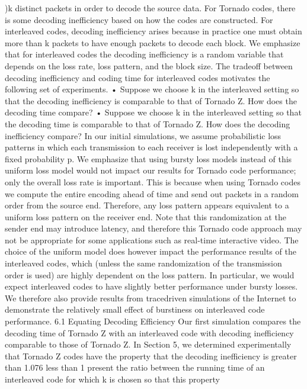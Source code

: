 \documentclass[12pt,a4paper,titlepage,twocolumn]{article}
\begin{document}
)k distinct packets in order to decode the
source data. For Tornado codes, there is some decoding
inefficiency based on how the codes are constructed. For
interleaved codes, decoding inefficiency arises because in
practice one must obtain more than k packets to have
enough packets to decode each block. We emphasize
that for interleaved codes the decoding inefficiency is a
random variable that depends on the loss rate, loss pattern,
and the block size. The tradeoff between decoding
inefficiency and coding time for interleaved codes motivates
the following set of experiments.
• Suppose we choose k in the interleaved setting
so that the decoding inefficiency is comparable to
that of Tornado Z. How does the decoding time
compare?
• Suppose we choose k in the interleaved setting
so that the decoding time is comparable to that
of Tornado Z. How does the decoding inefficiency
compare?
In our initial simulations, we assume probabilistic
loss patterns in which each transmission to each receiver
is lost independently with a fixed probability p.
We emphasize that using bursty loss models instead of
this uniform loss model would not impact our results for
Tornado code performance; only the overall loss rate is
important. This is because when using Tornado codes
we compute the entire encoding ahead of time and send
out packets in a random order from the source end.
Therefore, any loss pattern appears equivalent to a uniform
loss pattern on the receiver end. Note that this
randomization at the sender end may introduce latency,
and therefore this Tornado code approach may not be
appropriate for some applications such as real-time interactive
video.
The choice of the uniform model does however impact
the performance results of the interleaved codes,
which (unless the same randomization of the transmission
order is used) are highly dependent on the loss
pattern. In particular, we would expect interleaved
codes to have slightly better performance under bursty
losses. We therefore also provide results from tracedriven
simulations of the Internet to demonstrate the
relatively small effect of burstiness on interleaved code
performance.
6.1 Equating Decoding Efficiency
Our first simulation compares the decoding time of Tornado
Z with an interleaved code with decoding inefficiency
comparable to those of Tornado Z. In Section
5, we determined experimentally that Tornado Z codes
have the property that the decoding inefficiency is greater
than 1.076 less than 1%
present the ratio between the running time of an interleaved
code for which k is chosen so that this property
\end{document}

